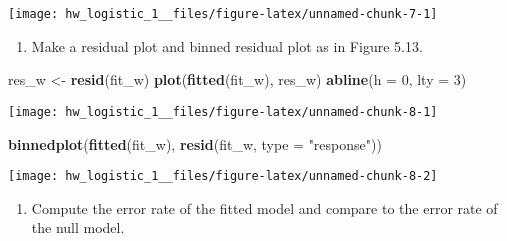 \documentclass[]{article}
\newenvironment{Shaded}{\begin{snugshade}}{\end{snugshade}}
\newcommand{\KeywordTok}[1]{\textcolor[rgb]{0.13,0.29,0.53}{\textbf{#1}}}
\newcommand{\DataTypeTok}[1]{\textcolor[rgb]{0.13,0.29,0.53}{#1}}
\newcommand{\DecValTok}[1]{\textcolor[rgb]{0.00,0.00,0.81}{#1}}
\newcommand{\FloatTok}[1]{\textcolor[rgb]{0.00,0.00,0.81}{#1}}
\newcommand{\StringTok}[1]{\textcolor[rgb]{0.31,0.60,0.02}{#1}}
\newcommand{\CommentTok}[1]{\textcolor[rgb]{0.56,0.35,0.01}{\textit{#1}}}
\newcommand{\ControlFlowTok}[1]{\textcolor[rgb]{0.13,0.29,0.53}{\textbf{#1}}}
\newcommand{\OperatorTok}[1]{\textcolor[rgb]{0.81,0.36,0.00}{\textbf{#1}}}
\newcommand{\NormalTok}[1]{#1}
\providecommand{\tightlist}{%
  \setlength{\itemsep}{0pt}\setlength{\parskip}{0pt}}
\begin{document}
\begin{center}\texttt{[image: hw\_logistic\_1\_\_files/figure-latex/unnamed-chunk-7-1]} \end{center}

\begin{enumerate}
\def\labelenumi{\arabic{enumi}.}
\setcounter{enumi}{2}
\tightlist
\item
  Make a residual plot and binned residual plot as in Figure 5.13.
\end{enumerate}

\begin{Shaded}
\begin{Highlighting}[]
\NormalTok{res_w <-}\StringTok{ }\KeywordTok{resid}\NormalTok{(fit_w)}
\KeywordTok{plot}\NormalTok{(}\KeywordTok{fitted}\NormalTok{(fit_w), res_w)}
\KeywordTok{abline}\NormalTok{(}\DataTypeTok{h =} \DecValTok{0}\NormalTok{, }\DataTypeTok{lty =} \DecValTok{3}\NormalTok{)}
\end{Highlighting}
\end{Shaded}

\begin{center}\texttt{[image: hw\_logistic\_1\_\_files/figure-latex/unnamed-chunk-8-1]} \end{center}

\begin{Shaded}
\begin{Highlighting}[]
\KeywordTok{binnedplot}\NormalTok{(}\KeywordTok{fitted}\NormalTok{(fit_w), }\KeywordTok{resid}\NormalTok{(fit_w, }\DataTypeTok{type =} \StringTok{"response"}\NormalTok{))}
\end{Highlighting}
\end{Shaded}

\begin{center}\texttt{[image: hw\_logistic\_1\_\_files/figure-latex/unnamed-chunk-8-2]} \end{center}

\begin{enumerate}
\def\labelenumi{\arabic{enumi}.}
\setcounter{enumi}{3}
\tightlist
\item
  Compute the error rate of the fitted model and compare to the error
  rate of the null model.
\end{enumerate}

\begin{Shaded}
\end{Shaded}
\end{document}
